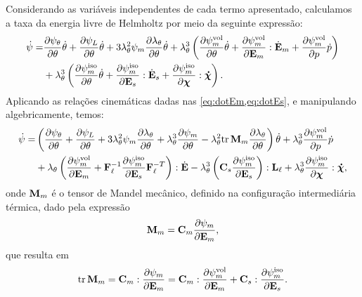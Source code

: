 \documentclass[Tese.tex]{subfiles}
\begin{document}
Considerando as variáveis independentes de cada termo apresentado, calculamos a taxa da energia livre de Helmholtz por meio da seguinte expressão:
\begin{equation}
\begin{aligned}
\dot{\psi} = &\dfrac{\partial\psi_{\theta}}{\partial\theta}\dot{\theta} + \dfrac{\partial\psi_L}{\partial\theta}\dot{\theta} + 3\lambda_{\theta}^2\psi_m\dfrac{\partial\lambda_{\theta}}{\partial\theta}\dot{\theta} + \lambda_{\theta}^3\left(\dfrac{\partial\psi_m^\text{vol}}{\partial\theta}\dot{\theta} + \dfrac{\partial\psi_m^\text{vol}}{\partial\mathbf{E}_m}:\dot{\mathbf{E}}_m + \dfrac{\partial\psi_m^\text{vol}}{\partial p}\dot{p}\right) \\
& + \lambda_{\theta}^3\left(\dfrac{\partial\psi_m^\text{iso}}{\partial\theta}\dot{\theta} + \dfrac{\partial\psi_m^\text{iso}}{\partial\mathbf{E}_s}:\dot{\mathbf{E}}_s + \dfrac{\partial\psi_m^\text{iso}}{\partial\boldsymbol{\chi}}:\boldsymbol{\dot{\chi}}\right).
\end{aligned}
\end{equation}
Aplicando as relações cinemáticas dadas nas \cref{eq:dotEm,eq:dotEs}, e manipulando algebricamente, temos:
\begin{equation}
\begin{aligned}
\dot{\psi} = &\left(\dfrac{\partial\psi_{\theta}}{\partial\theta} + \dfrac{\partial\psi_L}{\partial\theta} + 3\lambda_{\theta}^2\psi_m\dfrac{\partial\lambda_{\theta}}{\partial\theta} + \lambda_{\theta}^3\dfrac{\partial\psi_m}{\partial\theta} - \lambda_{\theta}^2\text{tr}\,\mathbf{M}_m\dfrac{\partial\lambda_{\theta}}{\partial\theta}\right)\dot{\theta}  + \lambda_{\theta}^3\dfrac{\partial\psi_m^\text{vol}}{\partial p}\dot{p}\\
&+ \lambda_{\theta}\left(\dfrac{\partial\psi_m^\text{vol}}{\partial\mathbf{E}_m} + \mathbf{F}_\ell^{-1}\dfrac{\partial\psi_m^\text{iso}}{\partial\mathbf{E}_s}\mathbf{F}_\ell^{-T}\right):\dot{\mathbf{E}} - \lambda_{\theta}^3\left(\mathbf{C}_s\dfrac{\partial\psi_m^\text{iso}}{\partial\mathbf{E}_s}\right):\mathbf{L}_\ell + \lambda_{\theta}^3\dfrac{\partial\psi_m^\text{iso}}{\partial\boldsymbol{\chi}}:\boldsymbol{\dot{\chi}}, \label{eq:dothelmholtz-phasechange}
\end{aligned}
\end{equation}
onde $\mathbf{M}_m$ é o tensor de Mandel mecânico, definido na configuração intermediária térmica, dado pela expressão
\begin{equation}
\mathbf{M}_m = \mathbf{C}_m\dfrac{\partial\psi_m}{\partial\mathbf{E}_m},
\end{equation}
que resulta em
\begin{equation}
\text{tr}\,\mathbf{M}_m = \mathbf{C}_m:\dfrac{\partial\psi_m}{\partial\mathbf{E}_m} = \mathbf{C}_m:\dfrac{\partial\psi_m^\text{vol}}{\partial\mathbf{E}_m} + \mathbf{C}_s:\dfrac{\partial\psi_m^\text{iso}}{\partial\mathbf{E}_s}. \label{eq:trMm}
\end{equation}
\end{document}

